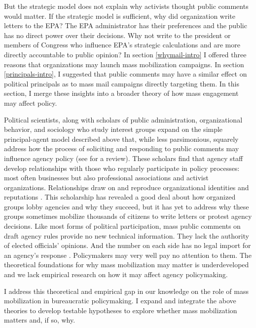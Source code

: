 But the strategic model does not explain why activists thought public comments would matter. If the strategic model is sufficient, why did organization write letters to the EPA? The EPA administrator has their preferences and the public has no direct power over their decisions. Why not write to the president or members of Congress who influence EPA's strategic calculations and are more directly accountable to public opinion? In section \ref{whymail-intro} I offered three reasons that organizations may launch mass mobilization campaigns. In section \ref{principals-intro}, I suggested that public comments may have a similar effect on political principals as to mass mail campaigns directly targeting them. In this section, I merge these insights into a broader theory of how mass engagement may affect policy. 

Political scientists, along with scholars of public administration, organizational behavior, and sociology who study interest groups expand on the simple principal-agent model described above that, while less parsimonious, squarely address how the process of soliciting and responding to public comments may influence agency policy (see \citet{Yackee2018} for a review). These scholars find that agency staff develop relationships with those who regularly participate in policy processes: most often businesses but also professional associations and activist organizations. Relationships draw on and reproduce organizational identities and reputations \citep{Carpenter2001, Carpenter2014, carpenter2012}. This scholarship has revealed a good deal about how organized groups lobby agencies and why they succeed, but it has yet to address why these groups sometimes mobilize thousands of citizens to write letters or protest agency decisions. Like most forms of political participation, 
mass public comments on draft agency rules provide no new technical information. 
They lack the authority of elected officials' opinions. 
And the number on each side has no legal import for an agency's response \citep{Kerwin2011}. %
Policymakers may very well pay no attention to them. The theoretical foundations for why mass mobilization may matter is underdeveloped and we lack empirical research on how it may affect agency policymaking. 

I address this theoretical and empirical gap in our knowledge on the role of mass mobilization in bureaucratic policymaking. I expand and integrate the above theories to develop testable hypotheses %
to explore whether mass mobilization matters and, if so, why. 

